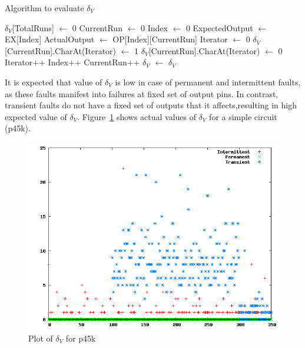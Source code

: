 \begin{algorithm}[H]
  \caption{Algorithm to evaluate $\delta_V$}
  \label{alg:deltav}
  \begin{algorithmic}
 \State $\delta_V$[TotalRuns] $\leftarrow$ 0\;
 \State CurrentRun $\leftarrow$ 0\;
  \State Index $\leftarrow$ 0\;
	\State ExpectedOutput $\leftarrow$ EX[Index]\;
	\State ActualOutput $\leftarrow$ OP[Index][CurrentRun]\;
   \State Iterator $\leftarrow$ 0\;
		 \State $\delta_V$[CurrentRun].CharAt(Iterator) $\leftarrow$ 1\;
		\Else
		 \State $\delta_V$[CurrentRun].CharAt(Iterator) $\leftarrow$ 0\;
		\EndIf
		\State Iterator++\;
		\EndWhile
	\State Index++\;
  \EndWhile
 \State CurrentRun++\;
 \EndWhile
 \State $\delta_V$ $\leftarrow$ \;
 \State \Return $\delta_V$\;
 \EndProcedure
 \end{algorithmic}
\end{algorithm}

It is expected that value of $\delta_V$ is low in case of permanent and intermittent faults, as these faults manifest into failures at fixed set of output pins. In contrast, transient faults do not have a fixed set of outputs that it affects,resulting in high expected value of $\delta_V$.  Figure~\ref{fig:deltavp45k} shows actual values of $\delta_V$ for a simple circuit (p45k).

\begin{figure}[h]
  \begin{center}
    \captionsetup{justification=centering}
    \includegraphics[scale=0.35]{figures/deltavp45k.png}
    \caption{Plot of $\delta_V$ for p45k}
    \label{fig:deltavp45k}
  \end{center}
\end{figure}

